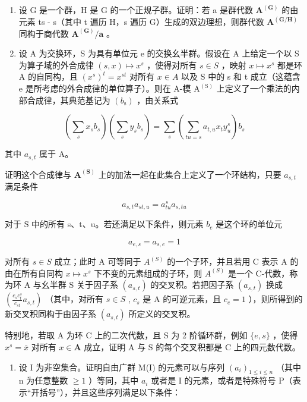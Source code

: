 \begin{enumerate}
\def\labelenumi{\arabic{enumi}.}
\setcounter{enumi}{9}
\item
  设 G 是一个群，H 是 G 的一个正规子群。证明：若 a 是群代数 \(\mathbf{A}^{(\mathbf{G})}\) 的由元素 ts - s（其中 t 遍历 H，s 遍历 G）生成的双边理想，则群代数 \(\mathbf{A}^{(\mathbf{G}/\mathbf{H})}\) 同构于商代数 \(\mathbf{A}^{(\mathbf{G})}/\mathbf{a}\) 。
\item
  设 A 为交换环，S 为具有单位元 e 的交换幺半群。假设在 A 上给定一个以 S 为算子域的外合成律 \((s, x) \mapsto x^{s}\) ，使得对所有 \(s \in S\) ，映射 \(x \mapsto x^{s}\) 都是环 A 的自同构，且 \((x^{s})^{t} = x^{st}\) 对所有 \(x \in A\) 以及 S 中的 s 和 t 成立（这蕴含 e 是所考虑的外合成律的单位算子）。则在 A-模 \(\mathrm{A}^{(\mathrm{S})}\) 上定义了一个乘法的内部合成律，其典范基记为 \((b_{\mathrm{s}})\) ，由关系式
\end{enumerate}

\[
\left(\sum_ {s} x _ {s} b _ {s}\right) \left(\sum_ {s} y _ {s} b _ {s}\right) = \sum_ {s} \left(\sum_ {t u = s} a _ {t, u} x _ {t} y _ {u} ^ {s}\right) b _ {s}
\]

其中 \(a_{s,t}\) 属于 A。

证明这个合成律与 \(\mathbf{A}^{(\mathbf{S})}\) 上的加法一起在此集合上定义了一个环结构，只要 \(a_{s,t}\) 满足条件

\[
a _ {s, t} a _ {s t, u} = a _ {t u} ^ {s} a _ {s, t u}
\]

对于 S 中的所有 s、t、u。若还满足以下条件，则元素 \(b_{e}\) 是这个环的单位元

\[
a _ {e, s} = a _ {s, e} = 1
\]

对所有 \(s \in S\) 成立；此时 A 可等同于 \(A^{(S)}\) 的一个子环，并且若用 C 表示 A 的由在所有自同构 \(x \mapsto x^s\) 下不变的元素组成的子环，则 \(A^{(S)}\) 是一个 C-代数，称为环 A 与幺半群 S 关于因子系 \((a_{s,t})\) 的交叉积。若把因子系 \((a_{s,t})\) 换成 \(\left(\frac{c_s c_t^s}{c_{st}} a_{s,t}\right)\) （其中，对所有 \(s \in S\) , \(c_s\) 是 A 的可逆元素，且 \(c_e = 1\) ），则所得到的新交叉积同构于由因子系 \((a_{s,t})\) 所定义的交叉积。

特别地，若取 A 为环 C 上的二次代数，且 S 为 2 阶循环群，例如 \(\{e, s\}\) ，使得 \(x^s = \bar{x}\) 对所有 \(x \in \mathbf{A}\) 成立，证明 A 与 S 的每个交叉积都是 C 上的四元数代数。

\begin{enumerate}
\def\labelenumi{\arabic{enumi}.}
\setcounter{enumi}{11}
\tightlist
\item
  设 I 为非空集合。证明自由广群 M(I) 的元素可以与序列 \((a_{i})_{1 \leqslant i \leqslant n}\) （其中 n 为任意整数 \(\geqslant 1\) ）等同，其中 \(a_{i}\) 或者是 I 的元素，或者是特殊符号 P（表示“开括号”），并且这些序列满足以下条件：
\end{enumerate}

